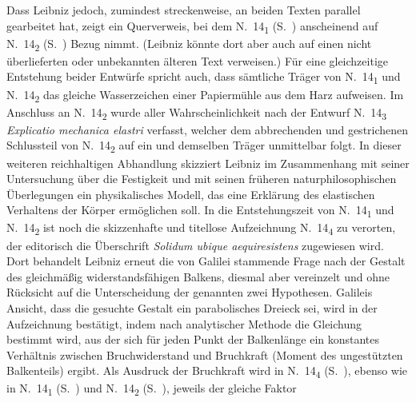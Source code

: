 Dass Leibniz jedoch, zumindest streckenweise, an beiden Texten parallel gearbeitet hat, zeigt ein Querverweis, bei dem N.~14\textsubscript{1} (S.~) anscheinend auf N.~14\textsubscript{2} (S.~) Bezug nimmt. (Leibniz könnte dort aber auch auf einen nicht überlieferten oder unbekannten älteren Text verweisen.)
Für eine gleichzeitige Entstehung beider Entwürfe spricht auch, dass sämtliche Träger von N.~14\textsubscript{1} und N.~14\textsubscript{2} das gleiche Wasserzeichen einer Papiermühle aus dem Harz\protect{} aufweisen.%
\pend%
\newpage%
\pstart%
Im Anschluss an N.~14\textsubscript{2} wurde aller Wahrscheinlichkeit nach der Entwurf N.~14\textsubscript{3} \textit{Explicatio mechanica elastri} verfasst,
welcher dem abbrechenden und gestrichenen Schlussteil von N.~14\textsubscript{2} auf ein und demselben Träger unmittelbar folgt.
In dieser weiteren reichhaltigen Abhandlung skizziert Leibniz im Zusammenhang mit seiner Untersuchung über die Festigkeit und mit seinen früheren naturphilosophischen Überlegungen ein physikalisches Modell, das eine Erklärung des elastischen Verhaltens der Körper ermöglichen soll. 
\pend%
% 
\pstart%
In
die Entstehungszeit von N.~14\textsubscript{1} und N.~14\textsubscript{2} ist noch die skizzenhafte und titellose Aufzeichnung N.~14\textsubscript{4} zu verorten, der editorisch die Überschrift \textit{Solidum ubique aequiresistens} zugewiesen wird.
Dort behandelt Leibniz erneut die von Galilei stammende Frage nach der Gestalt des gleichmäßig widerstandsfähigen Balkens, diesmal aber vereinzelt und ohne Rücksicht auf die Unterscheidung der genannten zwei \glqq Hypothesen\grqq.
Galileis Ansicht, dass die gesuchte Gestalt ein parabolisches Dreieck sei, wird in der Aufzeichnung bestätigt, indem nach analytischer Methode die Gleichung bestimmt wird, aus der sich für jeden Punkt der Balkenlänge ein konstantes Verhältnis zwischen Bruchwiderstand und Bruchkraft (Moment des ungestützten Balkenteils) ergibt.
Als Ausdruck der Bruchkraft wird in N.~14\textsubscript{4} (S.~), ebenso wie in N.~14\textsubscript{1} (S.~) und N.~14\textsubscript{2} (S.~), jeweils der gleiche Faktor %
